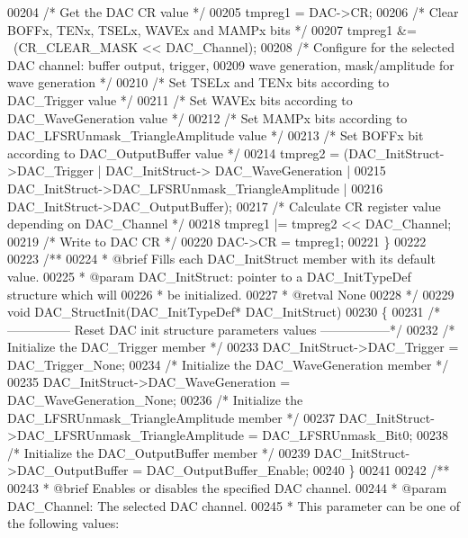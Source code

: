 \begin{DoxyCode}
00204   \textcolor{comment}{/* Get the DAC CR value */}
00205   tmpreg1 = DAC->CR;
00206   \textcolor{comment}{/* Clear BOFFx, TENx, TSELx, WAVEx and MAMPx bits */}
00207   tmpreg1 &= ~(CR_CLEAR_MASK << DAC\_Channel);
00208   \textcolor{comment}{/* Configure for the selected DAC channel: buffer output, trigger, }
00209 \textcolor{comment}{     wave generation, mask/amplitude for wave generation */}
00210   \textcolor{comment}{/* Set TSELx and TENx bits according to DAC\_Trigger value */}
00211   \textcolor{comment}{/* Set WAVEx bits according to DAC\_WaveGeneration value */}
00212   \textcolor{comment}{/* Set MAMPx bits according to DAC\_LFSRUnmask\_TriangleAmplitude value */}
00213   \textcolor{comment}{/* Set BOFFx bit according to DAC\_OutputBuffer value */}
00214   tmpreg2 = (DAC\_InitStruct->DAC_Trigger | DAC\_InitStruct->
      DAC_WaveGeneration |
00215              DAC\_InitStruct->DAC_LFSRUnmask_TriangleAmplitude |
00216              DAC\_InitStruct->DAC_OutputBuffer);
00217   \textcolor{comment}{/* Calculate CR register value depending on DAC\_Channel */}
00218   tmpreg1 |= tmpreg2 << DAC\_Channel;
00219   \textcolor{comment}{/* Write to DAC CR */}
00220   DAC->CR = tmpreg1;
00221 \}
00222 
00223 \textcolor{comment}{/**}
00224 \textcolor{comment}{  * @brief  Fills each DAC\_InitStruct member with its default value.}
00225 \textcolor{comment}{  * @param  DAC\_InitStruct: pointer to a DAC\_InitTypeDef structure which will }
00226 \textcolor{comment}{  *         be initialized.}
00227 \textcolor{comment}{  * @retval None}
00228 \textcolor{comment}{  */}
00229 \textcolor{keywordtype}{void} DAC_StructInit(DAC\_InitTypeDef* DAC\_InitStruct)
00230 \{
00231 \textcolor{comment}{/*--------------- Reset DAC init structure parameters values -----------------*/}
00232   \textcolor{comment}{/* Initialize the DAC\_Trigger member */}
00233   DAC\_InitStruct->DAC_Trigger = DAC_Trigger_None;
00234   \textcolor{comment}{/* Initialize the DAC\_WaveGeneration member */}
00235   DAC\_InitStruct->DAC_WaveGeneration = DAC_WaveGeneration_None;
00236   \textcolor{comment}{/* Initialize the DAC\_LFSRUnmask\_TriangleAmplitude member */}
00237   DAC\_InitStruct->DAC_LFSRUnmask_TriangleAmplitude = DAC_LFSRUnmask_Bit0;
00238   \textcolor{comment}{/* Initialize the DAC\_OutputBuffer member */}
00239   DAC\_InitStruct->DAC_OutputBuffer = DAC_OutputBuffer_Enable;
00240 \}
00241 
00242 \textcolor{comment}{/**}
00243 \textcolor{comment}{  * @brief  Enables or disables the specified DAC channel.}
00244 \textcolor{comment}{  * @param  DAC\_Channel: The selected DAC channel. }
00245 \textcolor{comment}{  *          This parameter can be one of the following values:}

\end{DoxyCode}
